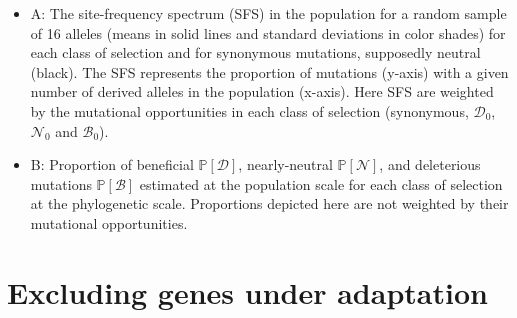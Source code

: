 \documentclass{article}
\newcommand{\proba}{\mathbb{P}}
\newcommand{\SphyDel}{\mathcal{D}_0}
\newcommand{\SphyNeu}{\mathcal{N}_0}
\newcommand{\SphyBen}{\mathcal{B}_0}
\newcommand{\SpopDel}{\mathcal{D}}
\newcommand{\SpopNeu}{\mathcal{N}}
\newcommand{\SpopBen}{\mathcal{B}}
\newcommand{\ProbaPopDel}{\proba [ \SpopDel]}
\newcommand{\ProbaPopNeu}{\proba [ \SpopNeu ]}
\newcommand{\ProbaPopBen}{\proba [ \SpopBen ]}
\begin{document}
    \begin{itemize}[itemsep=0pt]
        \item A: The site-frequency spectrum (SFS) in the population for a random sample of 16 alleles (means in solid lines and standard deviations in color shades) for each class of selection and for synonymous mutations, supposedly neutral (black). The SFS represents the proportion of mutations (y-axis) with a given number of derived alleles in the population (x-axis). Here SFS are weighted by the mutational opportunities in each class of selection (synonymous, $\SphyDel$, $\SphyNeu$ and $\SphyBen$).
        \item B: Proportion of beneficial $\ProbaPopDel$, nearly-neutral $\ProbaPopNeu$, and deleterious mutations $\ProbaPopBen$  estimated at the population scale for each class of selection at the phylogenetic scale. Proportions depicted here are not weighted by their mutational opportunities.
    \end{itemize}

    \newpage

    \section{Excluding genes under adaptation}
\end{document}
